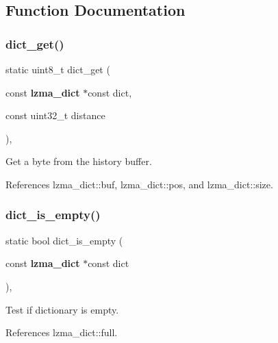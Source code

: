 \subsection{Function Documentation}
\mbox{\label{lz__decoder_8h_a4e7478dbf91637d16b8b6d173a773479}} 
\subsubsection{dict\+\_\+get()}
{\footnotesize\ttfamily static uint8\+\_\+t dict\+\_\+get (\begin{DoxyParamCaption}\item[{const \textbf{ lzma\+\_\+dict} $\ast$const}]{dict,  }\item[{const uint32\+\_\+t}]{distance }\end{DoxyParamCaption})\hspace{0.3cm}{\ttfamily [inline]}, {\ttfamily [static]}}



Get a byte from the history buffer. 



References lzma\+\_\+dict\+::buf, lzma\+\_\+dict\+::pos, and lzma\+\_\+dict\+::size.

\mbox{\label{lz__decoder_8h_a6da98d67d879288e96c80ecd5a2a1c16}} 
\subsubsection{dict\+\_\+is\+\_\+empty()}
{\footnotesize\ttfamily static bool dict\+\_\+is\+\_\+empty (\begin{DoxyParamCaption}\item[{const \textbf{ lzma\+\_\+dict} $\ast$const}]{dict }\end{DoxyParamCaption})\hspace{0.3cm}{\ttfamily [inline]}, {\ttfamily [static]}}



Test if dictionary is empty. 



References lzma\+\_\+dict\+::full.

\mbox{\label{lz__decoder_8h_a6fda74d5df0d5ee938f8dcbd493ed8a2}} 
